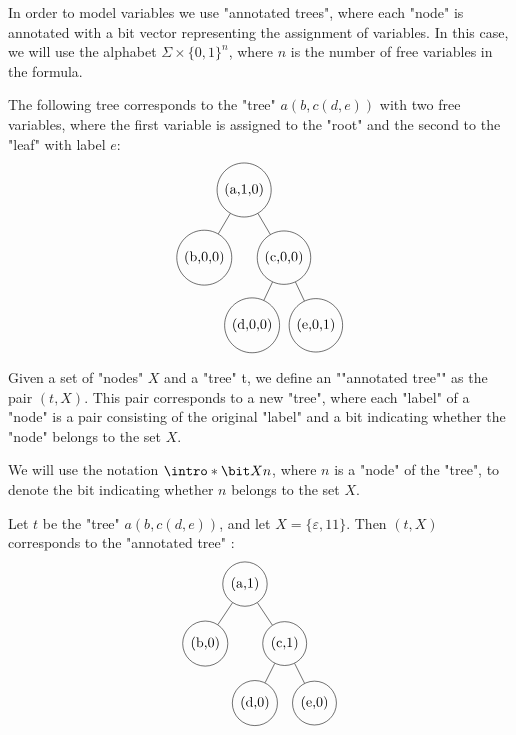 \documentclass[a4paper,UKenglish,cleveref, autoref, thm-restate]{lipics-v2021}
\begin{document}
In order to model variables we use "annotated trees", where each "node" is annotated with a bit vector representing the assignment of variables.
In this case, we will use the alphabet $\Sigma \times \{0,1\}^n$, where $n$ is the number of free variables in the formula.

\begin{example}
	The following tree corresponds to the "tree" $a(b,c(d,e))$ with two free variables, where the first variable is assigned to the "root" and the second to the "leaf"
	with label $e$:
	\[
		\begin{tikzpicture}[level distance=1.7cm,
				every node/.style={draw, circle, minimum size=5mm},
				level 1/.style={sibling distance=2cm},
				level 2/.style={sibling distance=1.6cm}]
			\node {(a,1,0)}
			child { node {(b,0,0)}}
			child { node {(c,0,0)}
					child {node {(d,0,0)}}
					child {node {(e,0,1)}} };
		\end{tikzpicture}
	\]

\end{example}

\begin{definition}
	Given a set of "nodes" $X$ and a "tree" t, we define an ""annotated tree"" as the pair $(t, X)$. This pair
	corresponds to a new "tree", where each "label" of a "node" is a pair consisting of the original "label" and a bit indicating whether the "node" belongs to the set $X$.

	We will use the notation $\intro*\bit X n $, where $n$ is a "node" of the "tree", to denote the bit indicating whether $n$ belongs to the set $X$.
\end{definition}

\begin{example}
	Let $t$ be the "tree" $a(b,c(d,e))$, and let $X = \{\varepsilon,11\}$.
	Then $(t, X)$ corresponds to the "annotated tree" :
	\[
		\begin{tikzpicture}[level distance=1.5cm,
				every node/.style={draw, circle, minimum size=5mm},
				level 1/.style={sibling distance=2cm},
				level 2/.style={sibling distance=1.5cm}]
			\node {(a,1)}
			child { node {(b,0)}}
			child { node {(c,1)}
					child {node {(d,0)}}
					child {node {(e,0)}} };
		\end{tikzpicture}
	\]
\end{example}



\end{document}
